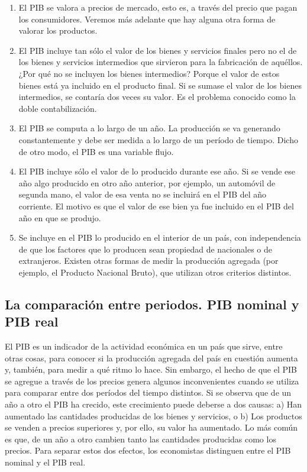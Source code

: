 \documentclass[
]{krantz}
\providecommand{\tightlist}{%
  \setlength{\itemsep}{0pt}\setlength{\parskip}{0pt}}
\begin{document}
\begin{enumerate}
\def\labelenumi{\alph{enumi})}
\tightlist
\item
  El PIB se valora a precios de mercado, esto es, a través del precio que pagan los consumidores. Veremos más adelante que hay alguna otra forma de valorar los productos.
\item
  El PIB incluye tan sólo el valor de los bienes y servicios finales pero no el de los bienes y servicios intermedios que sirvieron para la fabricación de aquéllos. ¿Por qué no se incluyen los bienes intermedios? Porque el valor de estos bienes está ya incluido en el producto final. Si se sumase el valor de los bienes intermedios, se contaría dos veces su valor. Es el problema conocido como la doble contabilización.
\item
  El PIB se computa a lo largo de un año. La producción se va generando constantemente y debe ser medida a lo largo de un período de tiempo. Dicho de otro modo, el PIB es una variable flujo.
\item
  El PIB incluye sólo el valor de lo producido durante ese año. Si se vende ese año algo producido en otro año anterior, por ejemplo, un automóvil de segunda mano, el valor de esa venta no se incluirá en el PIB del año corriente. El motivo es que el valor de ese bien ya fue incluido en el PIB del año en que se produjo.
\item
  Se incluye en el PIB lo producido en el interior de un país, con independencia de que los factores que lo producen sean propiedad de nacionales o de extranjeros. Existen otras formas de medir la producción agregada (por ejemplo, el Producto Nacional Bruto), que utilizan otros criterios distintos.
\end{enumerate}

\hypertarget{la-comparaciuxf3n-entre-periodos.-pib-nominal-y-pib-real}{%
\subsection{La comparación entre periodos. PIB nominal y PIB real}\label{la-comparaciuxf3n-entre-periodos.-pib-nominal-y-pib-real}}

El PIB es un indicador de la actividad económica en un país que sirve, entre otras cosas, para conocer si la producción agregada del país en cuestión aumenta y, también, para medir a qué ritmo lo hace. Sin embargo, el hecho de que el PIB se agregue a través de los precios genera algunos inconvenientes cuando se utiliza para comparar entre dos períodos del tiempo distintos. Si se observa que de un año a otro el PIB ha crecido, este crecimiento puede deberse a dos causas:
a) Han aumentado las cantidades producidas de los bienes y servicios, o
b) Los productos se venden a precios superiores y, por ello, su valor ha aumentado.
Lo más común es que, de un año a otro cambien tanto las cantidades producidas como los precios. Para separar estos dos efectos, los economistas distinguen entre el PIB nominal y el PIB real.
\end{document}

